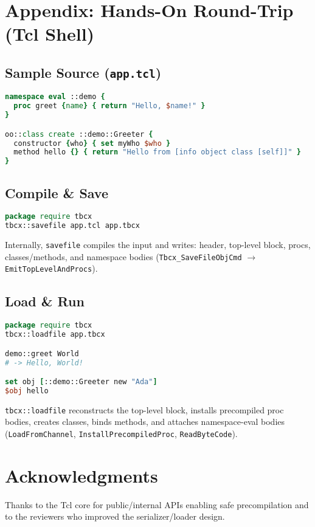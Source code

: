 \documentclass[11pt,a4paper]{article}
\begin{document}
\appendix
\section*{Appendix: Hands-On Round-Trip (Tcl Shell)}
\subsection*{Sample Source (\texttt{app.tcl})}
\begin{lstlisting}[language=tcl]
namespace eval ::demo {
  proc greet {name} { return "Hello, $name!" }
}

oo::class create ::demo::Greeter {
  constructor {who} { set myWho $who }
  method hello {} { return "Hello from [info object class [self]]" }
}
\end{lstlisting}

\subsection*{Compile \& Save}
\begin{lstlisting}[language=tcl]
package require tbcx
tbcx::savefile app.tcl app.tbcx
\end{lstlisting}
\noindent Internally, \texttt{savefile} compiles the input and writes: header, top-level block, procs, classes/methods, and namespace bodies (\texttt{Tbcx\_SaveFileObjCmd} $\rightarrow$ \texttt{EmitTopLevelAndProcs}).

\subsection*{Load \& Run}
\begin{lstlisting}[language=tcl]
package require tbcx
tbcx::loadfile app.tbcx

demo::greet World
# -> Hello, World!

set obj [::demo::Greeter new "Ada"]
$obj hello
\end{lstlisting}
\noindent \texttt{tbcx::loadfile} reconstructs the top-level block, installs precompiled proc bodies, creates classes, binds methods, and attaches namespace-eval bodies (\texttt{LoadFromChannel}, \texttt{InstallPrecompiledProc}, \texttt{ReadByteCode}).

\section*{Acknowledgments}
Thanks to the Tcl core for public/internal APIs enabling safe precompilation and to the reviewers who improved the serializer/loader design.
\end{document}

